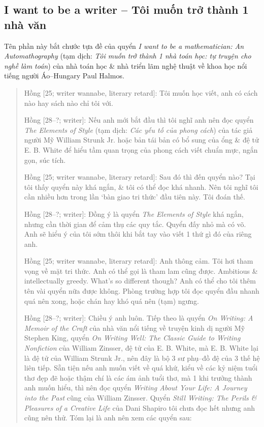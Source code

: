 \documentclass[12pt]{article}
\begin{document}
\subsection{I want to be a writer -- Tôi muốn trở thành 1 nhà văn}
\label{sect: writer wannabe}
Tên phần này bắt chước tựa đề của quyển {\it I want to be a mathematician: An Automathography} \cite{Halmos1985,Halmos1985_3_parts} (tạm dịch: {\it Tôi muốn trở thành 1 nhà toán học: tự truyện cho nghề làm toán}) của nhà toán học \& nhà triển lãm nghệ thuật về khoa học nổi tiếng người Áo--Hungary {\sc Paul Halmos}.
\begin{quotation}
	{\sf Hồng [25; writer wannabe, literary retard]}: Tôi muốn học viết, anh có cách nào hay sách nào chỉ tôi với.
	
	{\sf Hồng [28--?; writer]}: Nếu anh mới bắt đầu thì tôi nghĩ anh nên đọc quyển {\it The Elements of Style} \cite{Strunk1918} (tạm dịch: {\it Các yếu tố của phong cách}) của tác giả người Mỹ {\sc William Strunk Jr.} hoặc bản tái bản có bổ sung \cite{Strunk_White2019} của ổng \& đệ tử {\sc E. B. White} để hiểu tầm quan trọng của phong cách viết chuẩn mực, ngắn gọn, súc tích.
	
	{\sf Hồng [25; writer wannabe, literary retard]}: Sau đó thì đến quyển nào? Tại tôi thấy quyển này khá ngắn, \& tôi có thể đọc khá nhanh. Nên tôi nghĩ tôi cần nhiều hơn trong lần `bàn giao tri thức' đầu tiên này. Tôi đoán thế.
	
	{\sf Hồng [28--?; writer]}: Đồng ý là quyển {\it The Elements of Style} khá ngắn, nhưng cần thời gian để cảm thụ các quy tắc. Quyển đấy nhỏ mà có võ. Anh sẽ hiểu ý của tôi sớm thôi khi bắt tay vào viết 1 thứ gì đó của riêng anh.
	
	{\sf Hồng [25; writer wannabe, literary retard]}: Anh thông cảm. Tôi hơi tham vọng về mặt tri thức. Anh có thể gọi là tham lam cũng được. Ambitious \& intellectually greedy. What's so different though? Anh có thể cho tôi thêm tên vài quyển nữa được không. Phòng trường hợp tôi đọc quyển đầu nhanh quá nên xong, hoặc chán hay khó quá nên (tạm) ngưng.
	
	{\sf Hồng [28--?; writer]}: Chiều ý anh luôn. Tiếp theo là quyển {\it On Writing: A Memoir of the Craft} \cite{King2000,King2010} của nhà văn nổi tiếng về truyện kinh dị người Mỹ {\sc Stephen King}, quyển {\it On Writing Well: The Classic Guide to Writing Nonfiction} \cite{Zinsser2001,Zinsser2016} của {\sc William Zinsser}, đệ tử của {\sc E. B. White}, mà {\sc E. B. White} lại là đệ tử của {\sc William Strunk Jr.}, nên đây là bộ 3 sư phụ--đồ đệ của 3 thế hệ liên tiếp. Sẵn tiện nếu anh muốn viết về quá khứ, kiểu về các kỷ niệm tuổi thơ đẹp đẽ hoặc thậm chí là các ám ảnh tuổi thơ, mà 1 khi trưởng thành anh muốn hiểu, thì nên đọc quyển {\it Writing About Your Life: A Journey into the Past} \cite{Zinsser2005} cũng của {\sc William Zinsser}. Quyển {\it Still Writing: The Perils \& Pleasures of a Creative Life} của {\sc Dani Shapiro} tôi chưa đọc hết nhưng anh cũng nên thử. Tóm lại là anh nên xem các quyển sau:
\end{quotation}
\end{document}
